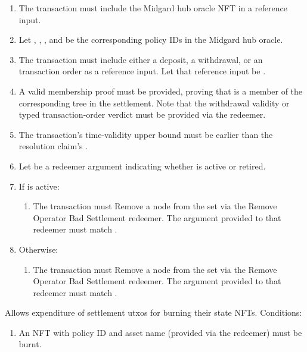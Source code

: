 \documentclass[../midgard.tex]{subfiles}
\begin{document}
\begin{description}
\begin{enumerate}
        \item The transaction must include the Midgard hub oracle NFT in a reference input.
        \item Let , , , and  be the corresponding policy IDs in the Midgard hub oracle.
        \item The transaction must include either a deposit, a withdrawal, or an transaction order as a reference input.
          Let that reference input be .
        \item A valid membership proof must be provided, proving that  is a member of the corresponding tree in the settlement.
          Note that the withdrawal validity or typed transaction-order verdict must be provided via the redeemer.
        \item The transaction's time-validity upper bound must be earlier than the resolution claim's .
        \item Let  be a redeemer argument indicating whether  is active or retired.
        \item If  is active:
            \begin{enumerate}
                \item The transaction must Remove a node from the  set via the Remove Operator Bad Settlement redeemer.
                  The  argument provided to that redeemer must match .
            \end{enumerate}
        \item Otherwise:
            \begin{enumerate}
                \item The transaction must Remove a node from the  set via the Remove Operator Bad Settlement redeemer.
                  The  argument provided to that redeemer must match .
            \end{enumerate}
      \end{enumerate}
  \item[Resolve.] Allows expenditure of settlement utxos for burning their state NFTs.
    Conditions:
      \begin{enumerate}
        \item An NFT with policy ID  and asset name  (provided via the redeemer) must be burnt.
      \end{enumerate}
\end{description}
\end{document}
